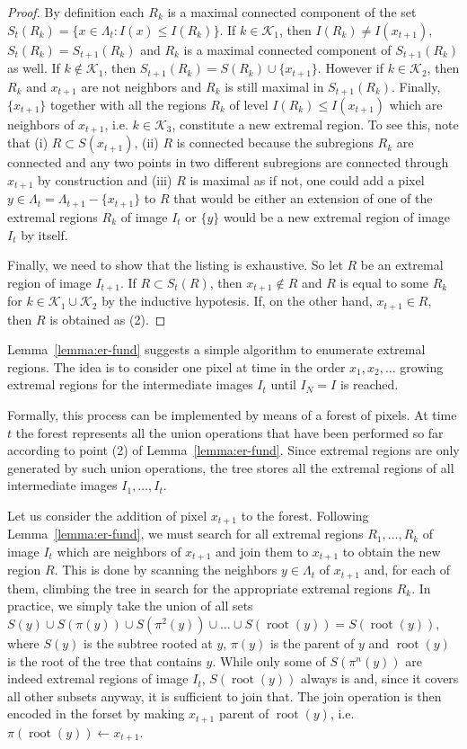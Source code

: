 \documentclass{article}
\newcommand{\rt}{\operatorname{root}}
\begin{document}
\begin{proof}
By definition each $R_k$ is a maximal connected component of the set $S_t(R_k) = \{x\in\Lambda_t : I(x) \leq I(R_k)\}$. If $k\in\mathcal{K}_1$, then $I(R_k)\not= I(x_{t+1})$, $S_t(R_k) = S_{t+1}(R_k)$ and $R_k$ is a maximal connected component of $S_{t+1}(R_k)$ as well. If $k\not\in\mathcal{K}_1$, then $S_{t+1}(R_k) = S(R_k) \cup \{x_{t+1}\}$. However if $k\in\mathcal{K}_2$, then $R_k$ and $x_{t+1}$ are not neighbors and $R_k$ is still maximal in $S_{t+1}(R_k)$. Finally, $\{x_{t+1}\}$ together with all the regions $R_k$ of level $I(R_k) \leq I(x_{t+1})$ which are neighbors of $x_{t+1}$, i.e. $k\in\mathcal{K}_3$, constitute a new extremal region. To see this, note that (i) $R\subset S(x_{t+1})$, (ii) $R$ is connected because the subregions $R_k$ are connected and any two points in two different subregions are connected through $x_{t+1}$ by construction and (iii) $R$ is maximal as if not, one could add a pixel $y \in \Lambda_t = \Lambda_{t+1} - \{x_{t+1}\}$ to $R$ that would be either an extension of one of the extremal regions $R_k$ of image $I_t$ or $\{y\}$ would be a new extremal region of image $I_t$ by itself.
	
Finally, we need to show that the listing is exhaustive. So let $R$ be an extremal region of image $I_{t+1}$. If $R \subset S_t(R)$, then $x_{t+1}\not\in R$ and $R$ is equal to some $R_k$ for $k\in\mathcal{K}_1\cup\mathcal{K}_2$ by the inductive hypotesis. If, on the other hand, $x_{t+1}\in R$, then $R$ is obtained as (2).
\end{proof}

Lemma~\ref{lemma:er-fund} suggests a simple algorithm to enumerate extremal regions. The idea is to consider one pixel at time in the order $x_1, x_2,\dots$ growing extremal regions for the intermediate images $I_t$ until $I_N=I$ is reached.

Formally, this process can be implemented by means of a forest of pixels. At time $t$ the forest represents all the union operations that have been performed so far according to point (2) of Lemma~\ref{lemma:er-fund}. Since extremal regions are only generated by such union operations, the tree stores all the extremal regions of all intermediate images $I_1,\dots,I_t$. 

Let us consider the addition of pixel $x_{t+1}$ to the forest. Following Lemma~\ref{lemma:er-fund}, we must search for all extremal regions $R_1,\dots,R_k$ of image $I_t$ which are neighbors of $x_{t+1}$ and join them to $x_{t+1}$ to obtain the new region $R$. This is done by scanning the neighbors $y\in\Lambda_{t}$ of $x_{t+1}$ and, for each of them, climbing the tree in search for the appropriate extremal regions $R_k$. In practice, we simply take the union of all sets $S(y) \cup S(\pi(y)) \cup S(\pi^2(y)) \cup \dots \cup S(\rt(y)) = S(\rt(y))$, where $S(y)$ is the subtree rooted at $y$, $\pi(y)$ is the parent of $y$ and $\rt(y)$ is the root of the tree that contains $y$. While only some of $S(\pi^n(y))$ are indeed extremal regions of image $I_t$, $S(\rt(y))$ always is and, since it covers all other subsets anyway, it is sufficient to join that.  The join operation is then encoded in the forset by making $x_{t+1}$ parent of $\rt(y)$, i.e. $\pi(\rt(y)) \leftarrow x_{t+1}$.
\end{document}
